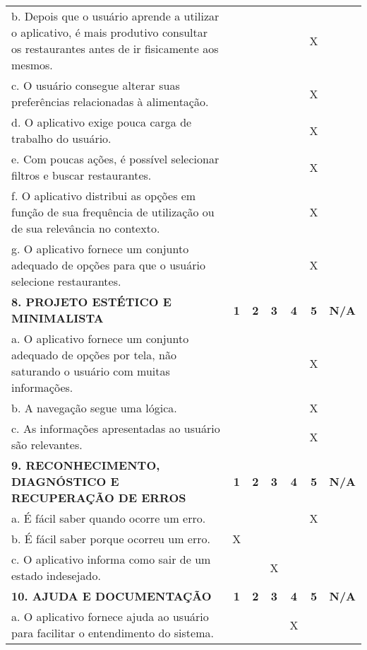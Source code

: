 \documentclass[portuguese,oneside]{tcc}
\begin{document}
\begin{center}
\begin{longtabu}{|L{25em}|c|c|c|c|c|c|}
												b. Depois que o usuário aprende a utilizar o aplicativo, é mais produtivo consultar os restaurantes antes de ir fisicamente aos mesmos. & & & & & X & \\ 
												c. O usuário consegue alterar suas preferências relacionadas à alimentação. & & & & & X & \\ 
												d. O aplicativo exige pouca carga de trabalho do usuário. & & & & & X & \\ 
												e. Com poucas ações, é possível selecionar filtros e buscar restaurantes. & & & & & X & \\ 
												f. O aplicativo distribui as opções em função de sua frequência de utilização ou de sua relevância no contexto.	& & & & & X & \\ 
												g. O aplicativo fornece um conjunto adequado de opções para que o usuário selecione restaurantes. & & & & & X & \\ 
												\textbf{8. PROJETO ESTÉTICO E MINIMALISTA} & \textbf{1} & \textbf{2} & \textbf{3} & \textbf{4} & \textbf{5} & \textbf{N/A} \\ 
												a. O aplicativo fornece um conjunto adequado de opções por tela, não saturando o usuário com muitas informações. & & & & & X & \\ 
												b. A navegação segue uma lógica. & & & & & X & \\ 
												c. As informações apresentadas ao usuário são relevantes. & & & & & X & \\ 
												\textbf{9. RECONHECIMENTO, DIAGNÓSTICO E RECUPERAÇÃO DE ERROS} & \textbf{1} & \textbf{2} & \textbf{3} & \textbf{4} & \textbf{5} & \textbf{N/A} \\ 
												a. É fácil saber quando ocorre um erro.	& & & & & X & \\ 
												b. É fácil saber porque ocorreu um erro. & X & & & & & \\ 
												c. O aplicativo informa como sair de um estado indesejado. & & & X & & & \\ 
												\textbf{10. AJUDA E DOCUMENTAÇÃO} & \textbf{1} & \textbf{2} & \textbf{3} & \textbf{4} & \textbf{5} & \textbf{N/A} \\ 
												a. O aplicativo fornece ajuda ao usuário para facilitar o entendimento do sistema. & & & & X & & \\ 

\end{longtabu}
\end{center}
\end{document}
